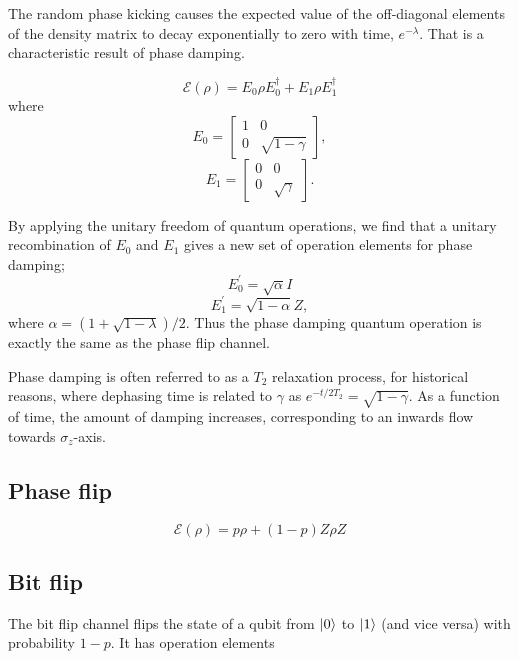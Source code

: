 \documentclass[11pt, oneside]{article}   	%
\begin{document}
The random phase kicking causes the expected value of the off-diagonal elements of the density matrix to decay exponentially to zero with time, $e^{- \lambda}$. 
That is a characteristic result of phase damping.

\begin{equation}
\mathcal{E} (\rho) = E_0 \rho E^{\dagger}_0 + E_1 \rho E^{\dagger}_1
\end{equation}
where 
\begin{equation}
E_0 = 
\begin{bmatrix}
1 & 0 \\
0 & \sqrt{1 - \gamma}
\end{bmatrix}, 
\end{equation}
\begin{equation}
E_1 = 
\begin{bmatrix}
0 & 0 \\
0 & \sqrt{\gamma}
\end{bmatrix}.
\end{equation}

By applying the unitary freedom of quantum operations, we find that a unitary recombination of $E_0$ and $E_1$ gives a new set of operation elements for phase damping;
\begin{equation}
E^{\prime}_0 = \sqrt{\alpha} I
\end{equation}
\begin{equation}
E^{\prime}_1 = \sqrt{1-\alpha} Z,
\end{equation}
where $\alpha = (1 + \sqrt{1-\lambda})/2$.
Thus the phase damping quantum operation is exactly the same as the phase flip channel.

Phase damping is often referred to as a $T_2$ relaxation process, for historical reasons, where dephasing time is related to $\gamma$ as $e^{-t / 2T_2} = \sqrt{1 - \gamma}$. 
As a function of time, the amount of damping increases, corresponding to an inwards flow towards $\sigma_z$-axis.

\subsection{Phase flip}
\begin{equation}
\mathcal{E} (\rho) = p \rho + (1-p) Z \rho Z 
\end{equation}

\subsection{Bit flip}
The bit flip channel flips the state of a qubit from $\ket{0}$ to $\ket{1}$ (and vice versa) with probability $1-p$. 
It has operation elements
\end{document}

